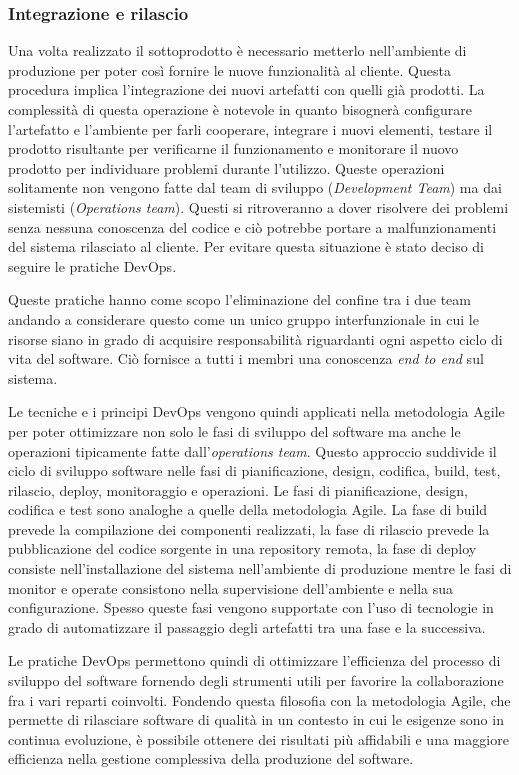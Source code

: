 \subsubsection{Integrazione e rilascio}
Una volta realizzato il sottoprodotto è necessario metterlo nell'ambiente di produzione per poter così fornire le nuove funzionalità al cliente.
Questa procedura implica l'integrazione dei nuovi artefatti con quelli già prodotti.
La complessità di questa operazione è notevole in quanto bisognerà configurare l'artefatto e l'ambiente per farli cooperare, integrare i nuovi elementi, testare il prodotto risultante
per verificarne il funzionamento e monitorare il nuovo prodotto per individuare problemi durante l'utilizzo.
Queste operazioni solitamente non vengono fatte dal team di sviluppo (\textit{Development Team}) ma dai sistemisti (\textit{Operations team}).
Questi si ritroveranno a dover risolvere dei problemi senza nessuna conoscenza del codice e ciò potrebbe portare a malfunzionamenti del sistema rilasciato al cliente.
Per evitare questa situazione è stato deciso di seguire le pratiche DevOps.

Queste pratiche hanno come scopo l'eliminazione del confine tra i due team andando a considerare questo come un unico gruppo interfunzionale in cui le risorse
siano in grado di acquisire responsabilità riguardanti ogni aspetto ciclo di vita del software. Ciò fornisce a tutti i membri
una conoscenza \textit{end to end} sul sistema.

Le tecniche e i principi DevOps vengono quindi applicati nella metodologia Agile per poter ottimizzare non solo le fasi di sviluppo del software ma
anche le operazioni tipicamente fatte dall'\textit{operations team}.
Questo approccio suddivide il ciclo di sviluppo software nelle fasi di pianificazione, design, codifica, build, test, rilascio, deploy, monitoraggio e operazioni.
Le fasi di pianificazione, design,  codifica e test sono analoghe a quelle della metodologia Agile. La fase di build prevede la compilazione dei componenti realizzati,
la fase di rilascio prevede la pubblicazione del codice sorgente in una repository remota, la fase di deploy consiste nell'installazione del sistema nell'ambiente di produzione
mentre le fasi di monitor e operate consistono nella supervisione dell'ambiente e nella sua configurazione.
Spesso queste fasi vengono supportate con l'uso di tecnologie in grado di automatizzare il passaggio degli artefatti tra una fase e la successiva.

Le pratiche DevOps permettono quindi di ottimizzare l'efficienza del processo di sviluppo del software fornendo degli strumenti utili per favorire la collaborazione fra i vari reparti coinvolti.
Fondendo questa filosofia con la metodologia Agile, che permette di rilasciare software di qualità in un contesto in cui le esigenze sono in continua evoluzione,
è possibile ottenere dei risultati più affidabili e una maggiore efficienza nella gestione complessiva della produzione del software.

